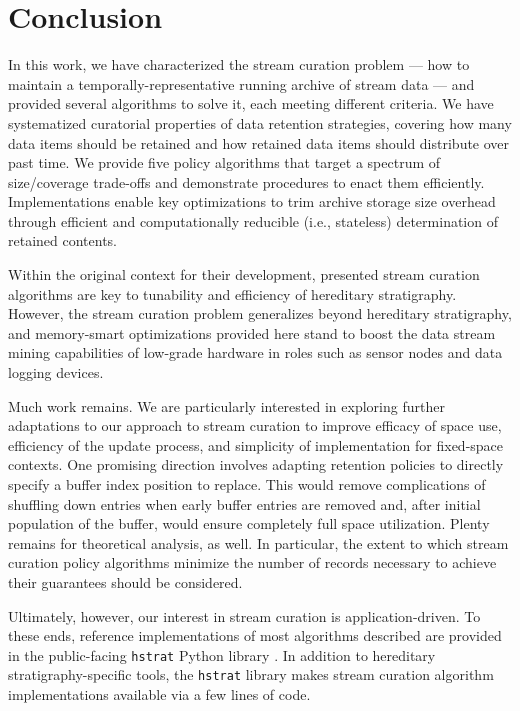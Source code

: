 \section{Conclusion} \label{sec:conclusion}

In this work, we have characterized the stream curation problem --- how to maintain a temporally-representative running archive of stream data --- and provided several algorithms to solve it, each meeting different criteria.
We have systematized curatorial properties of data retention strategies, covering how many data items should be retained and how retained data items should distribute over past time.
We provide five policy algorithms that target a spectrum of size/coverage trade-offs and demonstrate procedures to enact them efficiently.
Implementations enable key optimizations to trim archive storage size overhead through efficient and computationally reducible (i.e., stateless) determination of retained contents.

Within the original context for their development, presented stream curation algorithms are key to tunability and efficiency of hereditary stratigraphy.
However, the stream curation problem generalizes beyond hereditary stratigraphy, and memory-smart optimizations provided here stand to boost the data stream mining capabilities of low-grade hardware in roles such as sensor nodes and data logging devices.

Much work remains.
We are particularly interested in exploring further adaptations to our approach to stream curation to improve efficacy of space use, efficiency of the update process, and simplicity of implementation for fixed-space contexts.
One promising direction involves adapting retention policies to directly specify a buffer index position to replace.
This would remove complications of shuffling down entries when early buffer entries are removed and, after initial population of the buffer, would ensure completely full space utilization.
Plenty remains for theoretical analysis, as well.
In particular, the extent to which stream curation policy algorithms minimize the number of records necessary to achieve their guarantees should be considered.

Ultimately, however, our interest in stream curation is application-driven.
To these ends, reference implementations of most algorithms described are provided in the public-facing \texttt{hstrat} Python library \citep{moreno2022hstrat}.
In addition to hereditary stratigraphy-specific tools, the \texttt{hstrat} library makes stream curation algorithm implementations available via a few lines of code.
